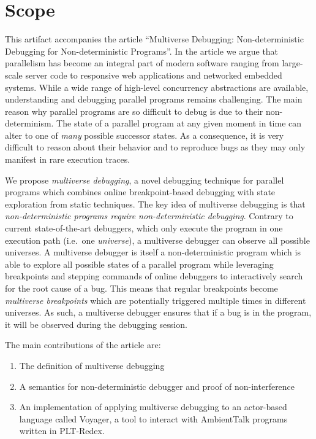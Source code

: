 \documentclass[a4paper,UKenglish]{darts-v2019}
\newenvironment{scope}{\section{Scope}}{}
\begin{document}
\begin{scope}

This artifact accompanies the article ``Multiverse Debugging:
Non-deterministic Debugging for Non-deterministic Programs''. In the
article we argue that parallelism has become an integral part of modern
software ranging from large-scale server code to responsive web
applications and networked embedded systems. While a wide range of
high-level concurrency abstractions are available,
understanding and debugging parallel programs remains challenging. The
main reason why parallel programs are so difficult to debug is due to
their non-determinism. The state of a parallel program at any given
moment in time can alter to one of \emph{many} possible successor
states. As a consequence, it is very difficult to reason about their
behavior and to reproduce bugs as they may only manifest in rare
execution traces.

We propose \emph{multiverse debugging}, a novel debugging
technique for parallel programs which combines online breakpoint-based
debugging with state exploration from static techniques. The key idea of
multiverse debugging is that \emph{non-deterministic programs require
	non-deterministic debugging}. Contrary to current state-of-the-art
debuggers, which only execute the program in one execution path
(i.e.~one \emph{universe}), a multiverse debugger can observe all
possible universes. A multiverse debugger is itself a non-deterministic
program which is able to explore all possible states of a parallel
program while leveraging breakpoints and stepping commands of online
debuggers to interactively search for the root cause of a bug. This
means that regular breakpoints become \emph{multiverse breakpoints}
which are potentially triggered multiple times in different universes.
As such, a multiverse debugger ensures that if a bug is in the program,
it will be observed during the debugging session.

The main contributions of the article are:

\begin{enumerate}
	\item
	The definition of multiverse debugging
	\item
	A semantics for non-deterministic debugger and proof of
	non-interference
	\item
	An implementation of applying multiverse debugging to an actor-based
	language called Voyager, a tool to interact with AmbientTalk
	programs written in PLT-Redex.
\end{enumerate}


\end{scope}
\end{document}
